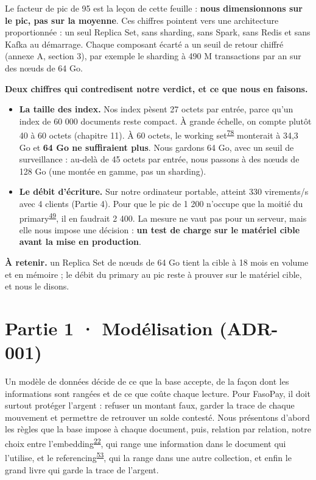 \documentclass[11pt,a4paper]{article}
\newcommand{\code}[1]{\texttt{\detokenize{#1}}}
\newcommand{\retenir}[1]{\par\smallskip\noindent\colorbox{grisfond}{\parbox{\dimexpr\linewidth-2\fboxsep}{\small\textbf{À retenir.} #1}}\par\smallskip}
\newcommand{\gl}[1]{\textsuperscript{\hyperlink{lex#1}{#1}}}
\begin{document}
	Le facteur de pic de 95 est la leçon de cette feuille : \textbf{nous dimensionnons sur le pic, pas sur la moyenne}. Ces chiffres pointent vers une architecture proportionnée : un seul Replica Set, sans sharding, sans Spark, sans Redis et sans Kafka au démarrage. Chaque composant écarté a un seuil de retour chiffré (annexe A, section 3), par exemple le sharding à 490 M transactions par an sur des nœuds de 64 Go.
	
	\textbf{Deux chiffres qui contredisent notre verdict, et ce que nous en faisons.}
	\begin{itemize}
		\item \textbf{La taille des index.} Nos index pèsent 27 octets par entrée, parce qu'un index de 60 000 documents reste compact. À grande échelle, on compte plutôt 40 à 60 octets (chapitre 11). À 60 octets, le working set\gl{78} monterait à 34,3 Go et \textbf{64 Go ne suffiraient plus}. Nous gardons 64 Go, avec un seuil de surveillance : au-delà de 45 octets par entrée, nous passons à des nœuds de 128 Go (une montée en gamme, pas un sharding).
		\item \textbf{Le débit d'écriture.} Sur notre ordinateur portable, \code{transfer()} atteint 330 virements/s avec 4 clients (Partie 4). Pour que le pic de 1 200 n'occupe que la moitié du primary\gl{49}, il en faudrait 2 400. La mesure ne vaut pas pour un serveur, mais elle nous impose une décision : \textbf{un test de charge sur le matériel cible avant la mise en production}.
	\end{itemize}
	
	\retenir{un Replica Set de nœuds de 64 Go tient la cible à 18 mois en volume et en mémoire ; le débit du primary au pic reste à prouver sur le matériel cible, et nous le disons.}
	
	\section{Partie 1 · Modélisation (ADR-001)}
	
	Un modèle de données décide de ce que la base accepte, de la façon dont les informations sont rangées et de ce que coûte chaque lecture. Pour FasoPay, il doit surtout protéger l'argent : refuser un montant faux, garder la trace de chaque mouvement et permettre de retrouver un solde contesté. Nous présentons d'abord les règles que la base impose à chaque document, puis, relation par relation, notre choix entre l'embedding\gl{22}, qui range une information dans le document qui l'utilise, et le referencing\gl{53}, qui la range dans une autre collection, et enfin le grand livre qui garde la trace de l'argent.
	
\end{document}
